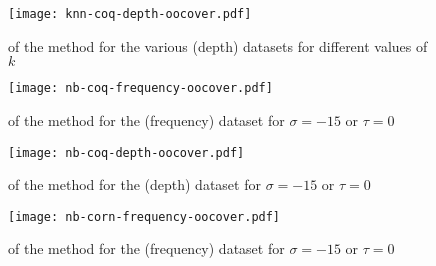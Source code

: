 \begin{figure}[H]
  \centering
  \texttt{[image: knn-coq-depth-oocover.pdf]}
  \caption{\oocover of the \knn method for the various (depth) datasets for different values of $k$}
\end{figure}

\begin{figure}[H]
  \centering
  \texttt{[image: nb-coq-frequency-oocover.pdf]}
  \caption{\oocover of the \nb method for the \coq (frequency) dataset for $\sigma = -15$ or $\tau = 0$}
\end{figure}

\begin{figure}[H]
  \centering
  \texttt{[image: nb-coq-depth-oocover.pdf]}
  \caption{\oocover of the \nb method for the \coq (depth) dataset for $\sigma = -15$ or $\tau = 0$}
\end{figure}

\begin{figure}[H]
  \centering
  \texttt{[image: nb-corn-frequency-oocover.pdf]}
  \caption{\oocover of the \nb method for the \corn (frequency) dataset for $\sigma = -15$ or $\tau = 0$}
\end{figure}
